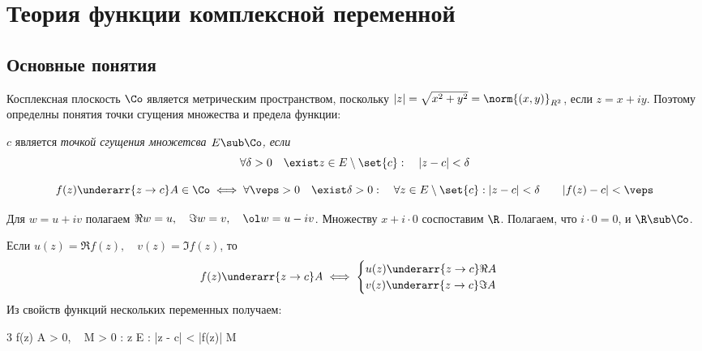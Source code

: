 \chapter{Теория функции комплексной переменной}

\section{Основные понятия}

Косплексная плоскость $ \Co $ является метрическим пространством, поскольку $ |z| = \sqrt{x^2 + y^2} = \norm{(x, y)}_{R^2} $, если $ z = x + i y $. Поэтому определны понятия точки сгущения множества и предела функции:

\begin{definition}
	$ c $ является \it{точкой сгущения} множетсва $ E \sub \Co $, если
	$$ \forall \delta > 0 \quad \exist z \in E \setminus \set{c} : \quad |z - c| < \delta $$
\end{definition}

\begin{definition}
	$$ f(z) \underarr{z \to c} A \in \Co \iff \forall \veps > 0 \quad \exist \delta > 0 : \quad \forall z \in E \setminus \set{c} : |z - c| < \delta \qquad |f(z) - c| < \veps $$
\end{definition}

Для $ w = u + iv $ полагаем $ \Re w = u, \quad \Im w = v, \quad \ol w = u - iv $. Множеству $ x + i \cdot 0 $ соспоставим $ \R $. Полагаем, что $ i \cdot 0 = 0 $, и $ \R \sub \Co $.

\begin{statement}
	Если $ u(z) = \Re f(z), \quad v(z) = \Im f(z) $, то
	$$ f(z) \underarr{z \to c} A \iff
	\begin{cases}
		u(z) \underarr{z \to c} \Re A \\
		v(z) \underarr{z \to c} \Im A
	\end{cases} $$
	Из свойств функций нескольких переменных получаем:
	\begin{equ}3
		f(z)  A \in \Co \implies \exist \delta > 0, ~ M > 0 : \quad \forall z \in E \setminus {} : |z - c| < \delta \qquad |f(z)| \le M
	\end{equ}
\end{statement}

